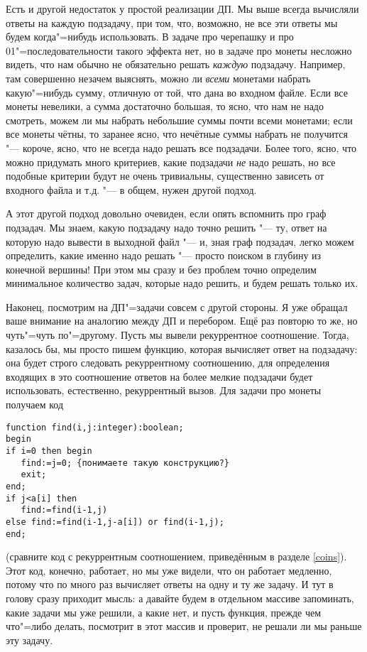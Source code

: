 Есть и другой недостаток у простой реализации ДП. Мы выше всегда вычисляли ответы на каждую подзадачу, при том, что, возможно, не все эти ответы мы будем когда"=нибудь использовать. В задаче про черепашку и про 01"=последовательности такого эффекта нет, но в задаче про монеты несложно видеть, что нам обычно не обязательно решать \textit{каждую} подзадачу. Например, там совершенно незачем выяснять, можно ли \textit{всеми} монетами набрать какую"=нибудь сумму, отличную от той, что дана во входном файле. Если все монеты невелики, а сумма достаточно большая, то ясно, что нам не надо смотреть, можем ли мы набрать небольшие суммы почти всеми монетами; если все монеты чётны, то заранее ясно, что нечётные суммы набрать не получится "--- короче, ясно, что не всегда надо решать все подзадачи. Более того, ясно, что можно придумать много критериев, какие подзадачи \textit{не} надо решать, но все подобные критерии будут не очень тривиальны, существенно зависеть от входного файла и т.д. "--- в общем, нужен другой подход.

А этот другой подход довольно очевиден, если опять вспомнить про граф подзадач. Мы знаем, какую подзадачу надо точно решить "--- ту, ответ на которую надо вывести в выходной файл "--- и, зная граф подзадач, легко можем определить, какие именно надо решать "--- просто поиском в глубину из конечной вершины! При этом мы сразу и без проблем точно определим минимальное количество задач, которые надо решить, и будем решать только их.

Наконец, посмотрим на ДП"=задачи совсем с другой стороны. Я уже обращал ваше внимание на аналогию между ДП и перебором. Ещё раз повторю то же, но чуть"=чуть по"=другому. Пусть мы вывели рекуррентное соотношение. Тогда, казалось бы, мы просто пишем функцию, которая вычисляет ответ на подзадачу: она будет строго следовать рекуррентному соотношению, для определения входящих в это соотношение ответов на более мелкие подзадачи будет использовать, естественно, рекуррентный вызов. Для задачи про монеты получаем код
\begin{codesampleo}\begin{verbatim}
function find(i,j:integer):boolean;
begin
if i=0 then begin
   find:=j=0; {понимаете такую конструкцию?}
   exit;
end;
if j<a[i] then
   find:=find(i-1,j)
else find:=find(i-1,j-a[i]) or find(i-1,j);
end;
\end{verbatim}\end{codesampleo}
(сравните код с рекуррентным соотношением, приведённым в разделе \ref{coins}). Этот код, конечно, работает, но мы уже видели, что он работает медленно, потому что по много раз вычисляет ответы на одну и ту же задачу. И тут в голову сразу приходит мысль: а давайте будем в отдельном массиве запоминать, какие задачи мы уже решили, а какие нет, и пусть функция, прежде чем что"=либо делать, посмотрит в этот массив и проверит, не решали ли мы раньше эту задачу.

